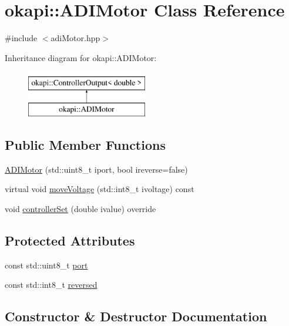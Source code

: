 \hypertarget{classokapi_1_1ADIMotor}{}\section{okapi\+::A\+D\+I\+Motor Class Reference}
\label{classokapi_1_1ADIMotor}


{\ttfamily \#include $<$adi\+Motor.\+hpp$>$}

Inheritance diagram for okapi\+::A\+D\+I\+Motor\+:\begin{figure}[H]
\begin{center}
\leavevmode
\includegraphics[height=2.000000cm]{classokapi_1_1ADIMotor}
\end{center}
\end{figure}
\subsection*{Public Member Functions}
\begin{DoxyCompactItemize}
\item 
\mbox{\hyperlink{classokapi_1_1ADIMotor_ab7a6273a01d5a0dccb4da0696b0b2050}{A\+D\+I\+Motor}} (std\+::uint8\+\_\+t iport, bool ireverse=false)
\item 
virtual void \mbox{\hyperlink{classokapi_1_1ADIMotor_a4c992efbe21467c0339308fba926b1a6}{move\+Voltage}} (std\+::int8\+\_\+t ivoltage) const
\item 
void \mbox{\hyperlink{classokapi_1_1ADIMotor_ac290a47e904c728ff1e61ee85408a1be}{controller\+Set}} (double ivalue) override
\end{DoxyCompactItemize}
\subsection*{Protected Attributes}
\begin{DoxyCompactItemize}
\item 
const std\+::uint8\+\_\+t \mbox{\hyperlink{classokapi_1_1ADIMotor_aae748af2c07c58821db34dff7924f4b7}{port}}
\item 
const std\+::int8\+\_\+t \mbox{\hyperlink{classokapi_1_1ADIMotor_a3abbe2875ba0abb35297d8dbe91cd4f4}{reversed}}
\end{DoxyCompactItemize}


\subsection{Constructor \& Destructor Documentation}
\mbox{\label{classokapi_1_1ADIMotor_ab7a6273a01d5a0dccb4da0696b0b2050}} 
